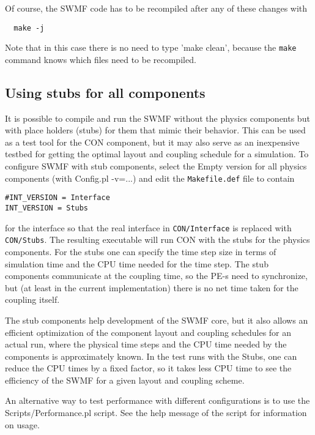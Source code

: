 Of course, the SWMF code has to be recompiled after any of these changes with
\begin{verbatim}
  make -j
\end{verbatim}
Note that in this case there is no need to type 'make clean', 
because the {\tt make} command knows which files need to be recompiled.

\subsection{Using stubs for all components}

It is possible to compile and run the SWMF without the physics components
but with place holders (stubs) for them that mimic their behavior.
This can be used as a test tool for the CON component, but it may
also serve as an inexpensive testbed for getting the optimal layout
and coupling schedule for a simulation. To configure SWMF with 
stub components, select the Empty version for all physics components
(with Config.pl -v=...) and edit the {\tt Makefile.def} file to
contain
\begin{verbatim}
#INT_VERSION = Interface
INT_VERSION = Stubs
\end{verbatim}
for the interface so that the real interface in {\tt CON/Interface}
is replaced with {\tt CON/Stubs}.
The resulting executable will run CON with 
the stubs for the physics components. For the stubs one can
specify the time step size in terms of simulation time and the
CPU time needed for the time step. The stub components communicate
at the coupling time, so the PE-s need to synchronize, but 
(at least in the current implementation) there is no net time taken
for the coupling itself. 

The stub components help development of the SWMF core, but it also
allows an efficient optimization of the component layout and coupling
schedules for an actual run, where the physical time steps
and the CPU time needed by the components is approximately known.
In the test runs with the Stubs, one can reduce the CPU times by 
a fixed factor, so it takes less CPU time to see the efficiency of the 
SWMF for a given layout and coupling scheme.

An alternative way to test performance with different configurations is
to use the Scripts/Performance.pl script. See the help message of the
script for information on usage.
